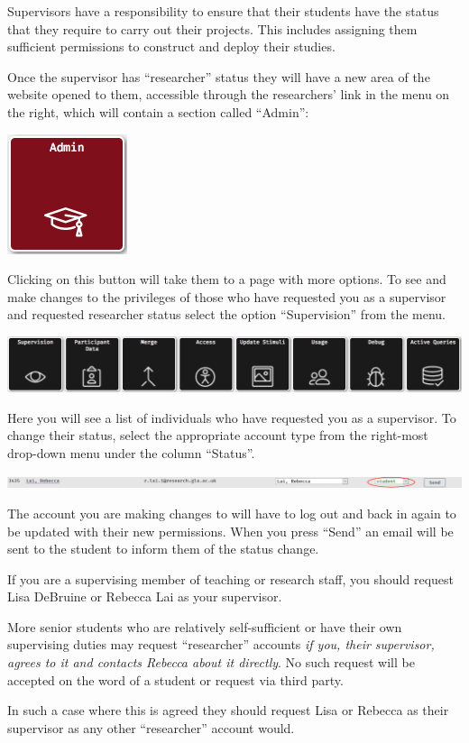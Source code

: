 \documentclass[]{book}
\begin{document}
Supervisors have a responsibility to ensure that their students have the status that they require to carry out their projects. This includes assigning them sufficient permissions to construct and deploy their studies.

Once the supervisor has ``researcher'' status they will have a new area of the website opened to them, accessible through the researchers' link in the menu on the right, which will contain a section called ``Admin'':

\includegraphics{images/screenshots/admin_button.png}

Clicking on this button will take them to a page with more options. To see and make changes to the privileges of those who have requested you as a supervisor and requested researcher status select the option ``Supervision'' from the menu.

\includegraphics{images/screenshots/admin_options.png}

Here you will see a list of individuals who have requested you as a supervisor. To change their status, select the appropriate account type from the right-most drop-down menu under the column ``Status''.

\includegraphics{images/screenshots/status_bar.png}

The account you are making changes to will have to log out and back in again to be updated with their new permissions. When you press ``Send'' an email will be sent to the student to inform them of the status change.

\begin{info}
If you are a supervising member of teaching or research staff, you
should request Lisa DeBruine or Rebecca Lai as your supervisor.

More senior students who are relatively self-sufficient or have their
own supervising duties may request ``researcher'' accounts \emph{if you,
their supervisor, agrees to it and contacts Rebecca about it directly}.
No such request will be accepted on the word of a student or request via
third party.

In such a case where this is agreed they should request Lisa or Rebecca
as their supervisor as any other ``researcher'' account would.
\end{info}
\end{document}
